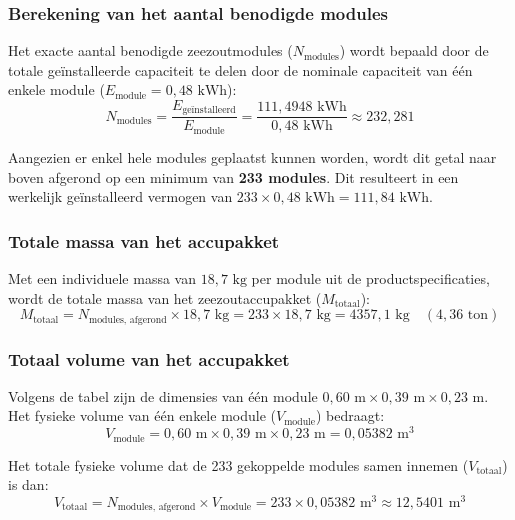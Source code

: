 \subsubsection*{Berekening van het aantal benodigde modules}
Het exacte aantal benodigde zeezoutmodules ($N_{\text{modules}}$) wordt bepaald door de totale geïnstalleerde capaciteit te delen door de nominale capaciteit van één enkele module ($E_{\text{module}} = 0{,}48 \text{ kWh}$):
\begin{equation}
N_{\text{modules}} = \frac{E_{\text{geïnstalleerd}}}{E_{\text{module}}} = \frac{111{,}4948 \text{ kWh}}{0{,}48 \text{ kWh}} \approx 232{,}281
\end{equation}

\noindent Aangezien er enkel hele modules geplaatst kunnen worden, wordt dit getal naar boven afgerond op een minimum van \textbf{233 modules}. Dit resulteert in een werkelijk geïnstalleerd vermogen van $233 \times 0{,}48 \text{ kWh} = 111{,}84 \text{ kWh}$.

\subsubsection*{Totale massa van het accupakket}
Met een individuele massa van $18{,}7 \text{ kg}$ per module uit de productspecificaties, wordt de totale massa van het zeezoutaccupakket ($M_{\text{totaal}}$):
\begin{equation}
M_{\text{totaal}} = N_{\text{modules, afgerond}} \times 18{,}7 \text{ kg} = 233 \times 18{,}7 \text{ kg} = 4357{,}1 \text{ kg} \quad (4{,}36 \text{ ton})
\end{equation}


\subsubsection*{Totaal volume van het accupakket}
Volgens de tabel zijn de dimensies van één module $0{,}60 \text{ m} \times 0{,}39 \text{ m} \times 0{,}23 \text{ m}$. Het fysieke volume van één enkele module ($V_{\text{module}}$) bedraagt:
\begin{equation}
V_{\text{module}} = 0{,}60 \text{ m} \times 0{,}39 \text{ m} \times 0{,}23 \text{ m} = 0{,}05382 \text{ m}^3
\end{equation}

Het totale fysieke volume dat de 233 gekoppelde modules samen innemen ($V_{\text{totaal}}$) is dan:
\begin{equation}
V_{\text{totaal}} = N_{\text{modules, afgerond}} \times V_{\text{module}} = 233 \times 0{,}05382 \text{ m}^3 \approx 12{,}5401 \text{ m}^3
\end{equation}


